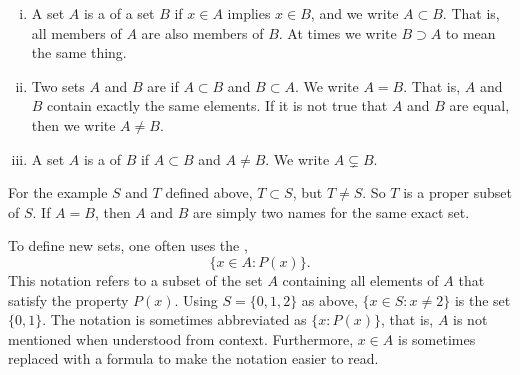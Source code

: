 \begin{myfigureht}
\caption{A diagram of the example sets $S$ and its subset $T$.\label{fig:sets}}
\end{myfigureht}

\begin{defn}
\pagebreak[2]
\leavevmode
\begin{enumerate}[(i)]
\item
A set $A$ is a \emph{}
of a set $B$ if $x \in A$ implies $x \in B$, and we write $A \subset B$.
That is, all members of $A$ are also members of $B$.  At times we
write $B \supset A$ to mean the same thing.
\item
Two sets $A$ and $B$ are \emph{} if $A \subset B$ and $B
\subset A$.  We write $A = B$.
That is, $A$ and $B$ contain exactly the same elements.
If it is not true that $A$ and $B$ are equal, then 
we write $A \neq B$.
\item
A set $A$ is a \emph{} of $B$ if $A \subset B$
and $A \neq B$.  We write $A \subsetneq B$.
\end{enumerate}
\end{defn}

For the example $S$ and $T$ defined above, $T \subset S$, but
$T \neq S$.  So $T$ is a proper subset of $S$.
If $A = B$, then $A$ and $B$ are simply two names for the
same exact set.

To define new sets, one often uses
the
\emph{},
\begin{equation*}
\bigl\{ x \in A : P(x) \bigr\} .
\end{equation*}
This notation refers to a subset of the set $A$ containing all elements
of $A$ that satisfy the property $P(x)$.
Using $S = \{ 0, 1, 2 \}$ as above, $\{ x \in S : x \neq 2 \}$
is the set $\{ 0, 1 \}$.
The notation is sometimes
abbreviated as $\bigl\{ x : P(x) \bigr\}$, that is, $A$ is not mentioned when understood from context.
Furthermore, $x \in A$ is sometimes replaced with a formula to make the notation
easier to read.  

